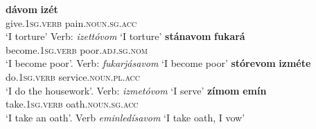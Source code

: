 \documentclass[output=paper,colorlinks,citecolor=brown]{langscibook}
\begin{document}
 \ea \label{ex:lvcintext}
 \begin{xlist}
\ex 
\gll  \textbf{{dávom}} \textbf{{izét}} \\
{give}.\textsc{1sg.verb} pain.\textsc{noun.sg.acc}\\
\glt `Ι torture'  Verb: \textit{izettóvom} `Ι torture'
\ex 
\gll \textbf{{stánavom}} \textbf{{fukará}}\\
{become}.\textsc{1sg.verb} poor.\textsc{adj.sg.nom} \\
\glt `Ι become poor'. Verb: \textit{fukarjásavom} `Ι become poor'
\ex 
\gll \textbf{{stórevom}} \textbf{{izméte}}\\
{do}.\textsc{1sg.verb} service.\textsc{noun.pl.acc}\\
\glt `Ι do the housework'. Verb: \textit{izmetóvom} `Ι serve'
\ex 
\gll \textbf{{zímom}} \textbf{{emín}} \\
{take}.\textsc{1sg.verb} oath.\textsc{noun.sg.acc} \\
\glt `Ι take an oath'. Verb \textit{eminledísavom} `Ι take oath, Ι vow'
\end{xlist}
\z
\end{document}
